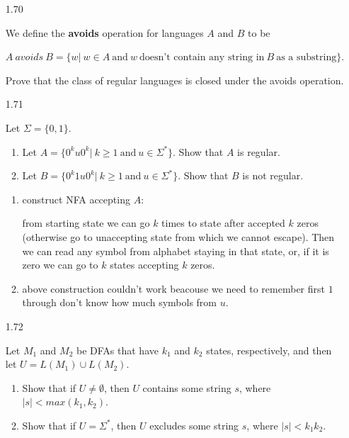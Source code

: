 \begin{enumerate}

      \item [1.70]
            
            We define the \textbf{avoids} operation for languages $A$ and $B$ to be
            
            $A ~avoids~ B = \{w|~w \in A ~\text{and} ~w~ \text{doesn’t contain any string in}~ B~ \text{as a substring}\}$.
            
            Prove that the class of regular languages is closed under the avoids operation.
            
      \item [1.71]
            
            Let $\Sigma =\{0,1\}$.
            
            \begin{enumerate}
                  \item Let $A =\{0^k u 0^k|~k \ge 1 ~\text{and}~ u \in \Sigma^\ast\}$. Show that $A$ is regular.
                  \item Let $B =\{0^k 1u0^k|~k \ge 1 ~\text{and}~ u \in \Sigma^\ast\}$. Show that $B$ is not regular.
            \end{enumerate}
            
            \begin{enumerate}
                  \item construct NFA accepting $A$:
                        
                        from starting state we can go $k$ times to state after accepted $k$ zeros (otherwise go to unaccepting state from which we cannot escape). Then we can read any symbol from alphabet staying in that state, or, if it is zero we can go to $k$ states accepting $k$ zeros.
                        
                  \item above construction couldn't work beacouse we need to remember first $1$ through don't know how much symbols from $u$.
            \end{enumerate}
            
      \item [1.72]
            
            Let $M_1$ and $M_2$ be DFAs that have $k_1$ and $k_2$ states, respectively, and then let
            $U = L(M_1) \cup L(M_2)$.
            \begin{enumerate}
                  \item Show that if $U \neq \emptyset$, then $U$ contains some string $s$, where $|s| < max(k_1,k_2)$.
                  \item Show that if $U=\Sigma^\ast$, then $U$ excludes some string $s$, where $|s| < k_1 k_2$.
            \end{enumerate}
            

\end{enumerate}
